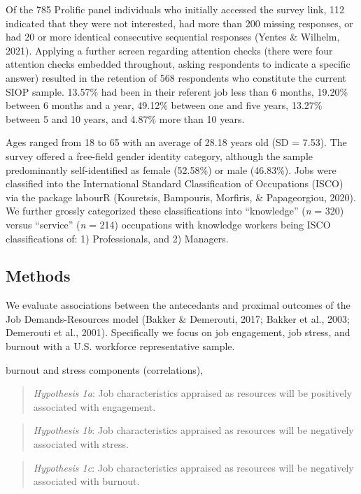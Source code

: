 \documentclass[
  english,
  man]{apa6}
\begin{document}
Of the 785 Prolific panel individuals who initially accessed the survey link, 112 indicated that they were not interested, had more than 200 missing responses, or had 20 or more identical consecutive sequential responses (Yentes \& Wilhelm, 2021). Applying a further screen regarding attention checks (there were four attention checks embedded throughout, asking respondents to indicate a specific answer) resulted in the retention of 568 respondents who constitute the current SIOP sample. 13.57\% had been in their referent job less than 6 months, 19.20\% between 6 months and a year, 49.12\% between one and five years, 13.27\% between 5 and 10 years, and 4.87\% more than 10 years.

Ages ranged from 18 to 65 with an average of 28.18 years old (SD = 7.53). The survey offered a free-field gender identity category, although the sample predominantly self-identified as female (52.58\%) or male (46.83\%). Jobs were classified into the International Standard Classification of Occupations (ISCO) via the package labourR (Kouretsis, Bampouris, Morfiris, \& Papageorgiou, 2020). We further grossly categorized these classifications into \enquote{knowledge} (\emph{n} = 320) versus \enquote{service} (\emph{n} = 214) occupations with knowledge workers being ISCO classifications of: 1) Professionals, and 2) Managers.

\hypertarget{methods-1}{%
\subsection{Methods}\label{methods-1}}

We evaluate associations between the antecedants and proximal outcomes of the Job Demands-Resources model (Bakker \& Demerouti, 2017; Bakker et al., 2003; Demerouti et al., 2001). Specifically we focus on job engagement, job stress, and burnout with a U.S. workforce representative sample.

burnout and stress components (correlations),

\begin{quote}
\emph{Hypothesis 1a}: Job characteristics appraised as resources will be positively associated with engagement.
\end{quote}

\begin{quote}
\emph{Hypothesis 1b}: Job characteristics appraised as resources will be negatively associated with stress.
\end{quote}

\begin{quote}
\emph{Hypothesis 1c}: Job characteristics appraised as resources will be negatively associated with burnout.
\end{quote}
\end{document}
